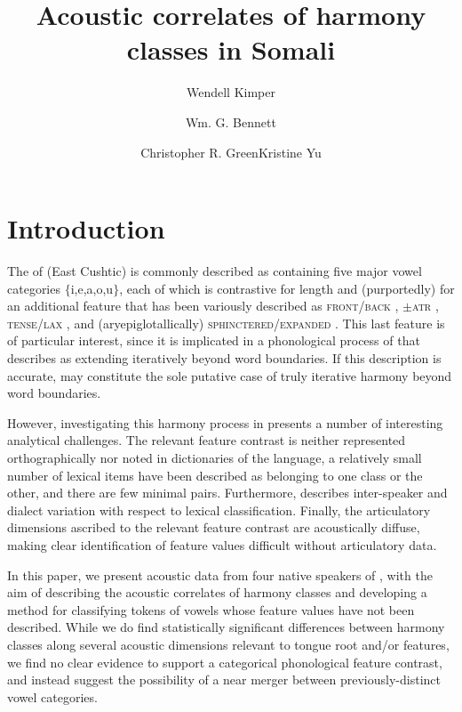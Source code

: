 \documentclass[output=paper,newtxmath,modfonts,nonflat,hidelinks]{langsci/langscibook}
\author{Wendell Kimper\affiliation{University of Manchester}\and Wm. G. Bennett\affiliation{University of Calgary and Rhodes University}\and Christopher R. Green\affiliation{Syracuse University}\lastand Kristine Yu\affiliation{University of Massachusetts at Amherst}}
\title{Acoustic correlates of harmony classes in Somali}
\begin{document}
\maketitle

\section{Introduction}

The  of  (East Cushtic) is commonly described as containing five major vowel categories $\lbrace$i,e,a,o,u$\rbrace$, each of which is contrastive for length and (purportedly) for an additional feature that has been variously described as \textsc{front/back} \citep{Andrzejewski1955}, \textsc{$\pm$atr} \citep{Saeed1993}, \textsc{tense/lax} \citep{Greenetal2015}, and (aryepiglotallically) \textsc{sphinctered/expanded} \citep{Edmondsonetal2004}. This last feature is of particular interest, since it is implicated in a phonological process of  that \cite{Andrzejewski1955} describes as extending iteratively beyond word boundaries.  If this description is accurate,  may constitute the sole putative case of truly iterative harmony beyond word boundaries.

However, investigating this harmony process in  presents a number of interesting analytical challenges.  The relevant feature contrast is neither represented orthographically nor noted in dictionaries of the language, a relatively small number of lexical items have been described as belonging to one class or the other, and there are few minimal pairs.  Furthermore, \cite{Andrzejewski1955} describes inter-speaker and dialect variation with respect to lexical classification.  Finally, the articulatory dimensions ascribed to the relevant feature contrast are acoustically diffuse, making clear identification of feature values difficult without articulatory data.

In this paper, we present acoustic data from four native speakers of , with the aim of describing the acoustic correlates of harmony classes and developing a method for classifying tokens of vowels whose feature values have not been described.  While we do find statistically significant differences between harmony classes along several acoustic dimensions relevant to tongue root and/or  features, we find no clear evidence to support a categorical phonological feature contrast, and instead suggest the possibility of a near merger between previously-distinct vowel categories.
\end{document}
